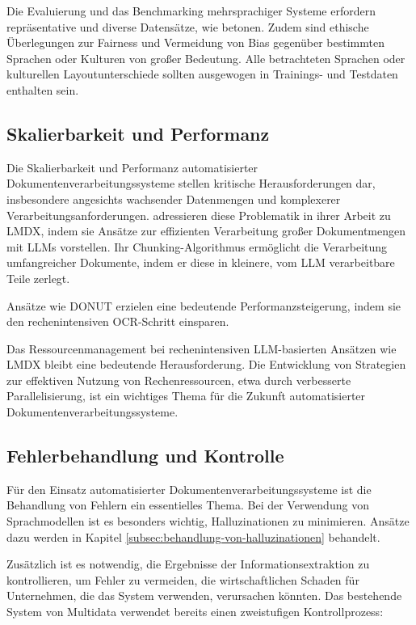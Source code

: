 Die Evaluierung und das Benchmarking mehrsprachiger Systeme erfordern repräsentative und diverse Datensätze, wie \textcite{SubramaniNishant2021ASoD} betonen. Zudem sind ethische Überlegungen zur Fairness und Vermeidung von Bias gegenüber bestimmten Sprachen oder Kulturen von großer Bedeutung. Alle betrachteten Sprachen oder kulturellen Layoutunterschiede sollten ausgewogen in Trainings- und Testdaten enthalten sein.

\subsection{Skalierbarkeit und Performanz}
\label{subsec:skalierbarkeit-und-performanz}

Die Skalierbarkeit und Performanz automatisierter Dokumentenverarbeitungssysteme stellen kritische Herausforderungen dar, insbesondere angesichts wachsender Datenmengen und komplexerer Verarbeitungsanforderungen. \textcite{PerotVincent2024LLMD} adressieren diese Problematik in ihrer Arbeit zu \gls{LMDX}, indem sie Ansätze zur effizienten Verarbeitung großer Dokumentmengen mit \glspl{LLM} vorstellen. Ihr Chunking-Algorithmus ermöglicht die Verarbeitung umfangreicher Dokumente, indem er diese in kleinere, vom \gls{LLM} verarbeitbare Teile zerlegt.

Ansätze wie \gls{DONUT} \cite{KimGeewook2022ODUT} erzielen eine bedeutende Performanzsteigerung, indem sie den rechenintensiven \gls{OCR}-Schritt einsparen.

Das Ressourcenmanagement bei rechenintensiven \gls{LLM}-basierten Ansätzen wie \gls{LMDX} \cite{PerotVincent2024LLMD} bleibt eine bedeutende Herausforderung. Die Entwicklung von Strategien zur effektiven Nutzung von Rechenressourcen, etwa durch verbesserte Parallelisierung, ist ein wichtiges Thema für die Zukunft automatisierter Dokumentenverarbeitungssysteme.

\subsection{Fehlerbehandlung und Kontrolle}
\label{subsec:fehlerbehandlung-und-kontrolle}

Für den Einsatz automatisierter Dokumentenverarbeitungssysteme ist die Behandlung von Fehlern ein essentielles Thema. Bei der Verwendung von Sprachmodellen ist es besonders wichtig, Halluzinationen zu minimieren. Ansätze dazu werden in Kapitel \ref{subsec:behandlung-von-halluzinationen} behandelt.

Zusätzlich ist es notwendig, die Ergebnisse der Informationsextraktion zu kontrollieren, um Fehler zu vermeiden, die wirtschaftlichen Schaden für Unternehmen, die das System verwenden, verursachen könnten. Das bestehende System von Multidata verwendet bereits einen zweistufigen Kontrollprozess:

